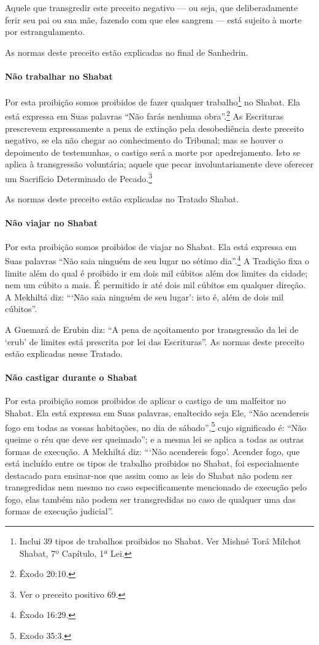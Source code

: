 Aquele que transgredir este preceito negativo --- ou seja, que deliberadamente ferir seu pai ou sua mãe, fazendo com que eles sangrem --- está sujeito à morte por estrangulamento.

As normas deste preceito estão explicadas no final de Sanhedrin.

\paragraph{Não trabalhar no Shabat}

Por esta proibição somos proibidos de fazer qualquer
trabalho\footnote{Inclui 39 tipos de trabalhos proibidos no Shabat. Ver Mishné Torá
  Milchot Shabat, 7º Capítulo, 1ª Lei.} no Shabat. Ela está expressa em Suas
palavras ``Não farás nenhuma obra''.\footnote{Êxodo 20:10.} As Escrituras
prescrevem expressamente a pena de extinção pela desobediência deste
preceito negativo, se ela não chegar ao conhecimento do Tribunal; mas se
houver o depoimento de testemunhas, o castigo será a morte por
apedrejamento. Isto se aplica à transgressão voluntária; aquele que
pecar involuntariamente deve oferecer um Sacrifício Determinado de
Pecado.\footnote{Ver o preceito positivo 69.}

As normas deste preceito estão explicadas no Tratado Shabat.

\paragraph{Não viajar no Shabat}

Por esta proibição somos proibidos de viajar no Shabat. Ela está
expressa em Suas palavras ``Não saia ninguém de seu lugar no sétimo
dia''.\footnote{Êxodo 16:29.} A Tradição fixa o limite além do qual é proibido ir
em dois mil cúbitos além dos limites da cidade; nem um cúbito a mais. É
permitido ir até dois mil cúbitos em qualquer direção. A Mekhiltá diz:
```Não saia ninguém de seu lugar': isto é, além de dois mil cúbitos''.

A Guemará de Erubin diz: ``A pena de açoitamento por transgressão da lei
de `erub' de limites está prescrita por lei das Escrituras''. As normas
deste preceito estão explicadas nesse Tratado.

\paragraph{Não castigar durante o Shabat}

Por esta proibição somos proibidos de aplicar o castigo de um malfeitor
no Shabat. Ela está expressa em Suas palavras, enaltecido seja Ele,
``Não acendereis fogo em todas as vossas habitações, no dia de sábado'',\footnote{Exodo 35:3.} cujo significado é: ``Não queime o réu que deve ser
queimado''; e a mesma lei se aplica a todas as outras formas de
execução. A Mekhiltá diz: ```Não acendereis fogo'. Acender fogo, que
está incluído entre os tipos de trabalho proibidos no Shabat, foi
especialmente destacado para ensinar-nos que assim como as leis do
Shabat não podem ser transgredidas nem mesmo no caso especificamente
mencionado de execução pelo fogo, elas também não podem ser
transgredidas no caso de qualquer uma das formas de execução judicial''.

